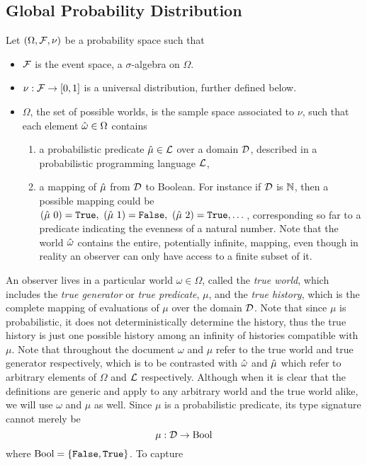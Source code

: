 \documentclass[]{article}
\begin{document}
\subsection{Global Probability Distribution}
\label{sec:globalprob}
Let $(\Omega, \mathcal{F}, \nu)$ be a probability space such that
\begin{itemize}
\item $\mathcal{F}$ is the event space, a $\sigma$-algebra on $\Omega$.
\item $\nu : \mathcal{F} \to [0, 1]$ is a universal distribution, further
  defined below.
\item $\Omega$, the set of possible worlds, is the sample space
  associated to $\nu$, such that each element $\hat{\omega} \in \Omega$
  contains
  \begin{enumerate}
  \item a probabilistic predicate $\hat{\mu} \in \mathcal{L}$ over a domain
    $\mathcal{D}$, described in a probabilistic programming language
    $\mathcal{L}$,
  \item a mapping of $\hat{\mu}$ from $\mathcal{D}$ to Boolean.  For instance
    if $\mathcal{D}$ is $\mathbb{N}$, then a possible mapping could be
    $(\anymu\ 0) = \T,\ (\anymu\ 1) = \F, \ (\anymu\ 2) = \T, \dots$,
    corresponding so far to a predicate indicating the evenness of a
    natural number.  Note that the world $\hat{\omega}$ contains
    the entire, potentially infinite, mapping, even though in reality
    an observer can only have access to a finite subset of it.
  \end{enumerate}
\end{itemize}
An observer lives in a particular world $\omega \in \Omega$, called
the \emph{true world}, which includes the \emph{true generator} or
\emph{true predicate}, $\mu$, and the \emph{true history}, which is
the complete mapping of evaluations of $\mu$ over the domain
$\mathcal{D}$.  Note that since $\mu$ is probabilistic, it does not
deterministically determine the history, thus the true history is just
one possible history among an infinity of histories compatible with
$\mu$.  Note that throughout the document $\omega$ and $\mu$ refer to
the true world and true generator respectively, which is to be
contrasted with $\hat{\omega}$ and $\hat{\mu}$ which refer to arbitrary
elements of $\Omega$ and $\mathcal{L}$ respectively.  Although when it
is clear that the definitions are generic and apply to any arbitrary
world and the true world alike, we will use $\omega$ and $\mu$ as
well.  Since $\mu$ is a probabilistic predicate, its type signature
cannot merely be
$$\mu : \mathcal{D} \to \textup{Bool}$$ where $\textup{Bool} = \{\texttt{False}, \texttt{True}\}$.  To capture
\end{document}
